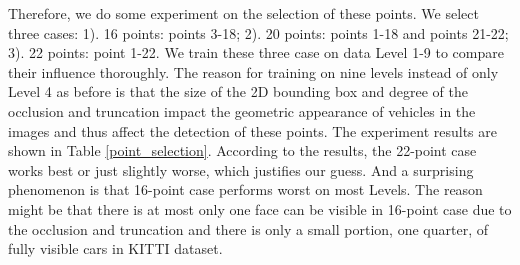 \documentclass[a4paper,12pt]{article}
\begin{document}
Therefore, we do some experiment on the selection of these points. We select three cases: 1). 16 points: points 3-18; 2). 20 points: points 1-18 and points 21-22; 3). 22 points: point 1-22. We train these three case on data Level 1-9 to compare their influence thoroughly. The reason for training on nine levels instead of only Level 4 as before is that the size of the 2D bounding box and degree of the occlusion and truncation impact the geometric appearance of vehicles in the images and thus affect the detection of these points. The experiment results are shown in Table \ref{point_selection}.  According to the results, the 22-point case works best or just slightly worse, which justifies our guess. And a surprising phenomenon is that 16-point case performs worst on most Levels. The reason might be that there is at most only one face can be visible in 16-point case due to the occlusion and truncation and there is only a small portion, one quarter, of fully visible cars in KITTI dataset.

\end{document}
